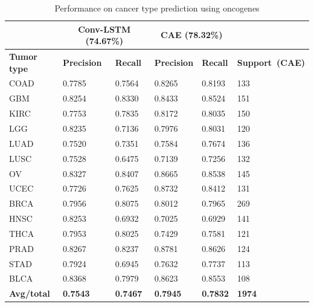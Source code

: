 \begin{table}[h]
\caption{Performance on cancer type prediction using oncogenes }
\label{table:resultoncogene} 
\begin{center}
    \scriptsize
    \vspace{-5mm}
    \begin{tabular}{l|ll|ll|l}
        \hline
        \rowcolor{Gray}
        {} & \multicolumn{2}{c}{\textbf{Conv-LSTM (74.67\%)}} & \multicolumn{2}{c}{\textbf{CAE (78.32\%)}} &  {} \\\hline
        \textbf{Tumor type }& \textbf{Precision} &  \textbf{Recall}  & \textbf{Precision} &  \textbf{Recall} & \textbf{Support~(CAE)} \\\hline
        COAD   & 0.7785 & 0.7564 & 0.8265 & 0.8193 & 133  \\\hline
        GBM    & 0.8254 & 0.8330 & 0.8433 & 0.8524 & 151  \\\hline
        KIRC   & 0.7753 & 0.7835 & 0.8172 & 0.8035 & 150  \\\hline
        LGG    & 0.8235 & 0.7136 & 0.7976 & 0.8031 & 120  \\\hline
        LUAD   & 0.7520 & 0.7351 & 0.7584 & 0.7674 & 136  \\\hline
        LUSC   & 0.7528 & 0.6475 & 0.7139 & 0.7256 & 132  \\\hline
        OV     & 0.8327 & 0.8407 & 0.8665 & 0.8538 & 145  \\\hline
        UCEC   & 0.7726 & 0.7625 & 0.8732 & 0.8412 & 131  \\\hline
        BRCA   & 0.7956 & 0.8075 & 0.8012 & 0.7965 & 269  \\\hline
        HNSC   & 0.8253 & 0.6932 & 0.7025 & 0.6929 & 141  \\\hline
        THCA   & 0.7953 & 0.8025 & 0.7429 & 0.7581 & 121  \\\hline
        PRAD   & 0.8267 & 0.8237 & 0.8781 & 0.8626 & 124  \\\hline
        STAD   & 0.7924 & 0.6945 & 0.7632 & 0.7737 & 113  \\\hline
        BLCA   & 0.8368 & 0.7979 & 0.8623 & 0.8553 & 108  \\\hline
        \rowcolor{LightCyan}
        \textbf{Avg/total} &   \textbf{0.7543}    &  \textbf{0.7467} &    \textbf{0.7945}   &  \textbf{0.7832} & \textbf{1974} \\\hline
    \end{tabular}
     \vspace{-6mm}
    \end{center}
\end{table}

